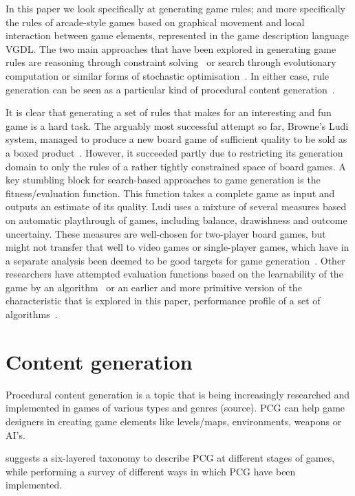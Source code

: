 \documentclass[a4paper,titlepage,final, twoside]{report}
\begin{document}
In this paper we look specifically at generating game rules; and more specifically the rules of arcade-style games based on graphical movement and local interaction between game elements, represented in the game description language VGDL. The two main approaches that have been explored in generating game rules are reasoning through constraint solving~\citet{smith2010variations} or search through evolutionary computation or similar forms of stochastic optimisation~\citet{togelius2008experiment,browne2008automated,font2013towards}. In either case, rule generation can be seen as a particular kind of procedural content generation~\citet{pcgbook:ch6}.

It is clear that generating a set of rules that makes for an interesting and fun game is a hard task. The arguably most successful attempt so far, Browne's Ludi system, managed to produce a new board game of sufficient quality to be sold as a boxed product~\citet{browne2008automated}. However, it succeeded partly due to restricting its generation domain to only the rules of a rather tightly constrained space of board games. A key stumbling block for search-based approaches to game generation is the fitness/evaluation function. This function takes a complete game as input and outputs an estimate of its quality. Ludi uses a mixture of several measures based on automatic playthrough of games, including balance, drawishness and outcome uncertainy. These measures are well-chosen for two-player board games, but might not transfer that well to video games or single-player games, which have in a separate analysis been deemed to be good targets for game generation~\citet{togelius2014characteristics}. Other researchers have attempted evaluation functions based on the learnability of the game by an algorithm~\citet{togelius2008experiment} or an earlier and more primitive version of the characteristic that is explored in this paper, performance profile of a set of algorithms~\citet{font2013towards}.


\section{Content generation}
Procedural content generation is a topic that is being increasingly researched and implemented in games of various types and genres (source). PCG can help game designers in creating game elements like levels/maps, environments, weapons or AI's.

\citet{hendrikx2013procedural} suggests a six-layered taxonomy to describe PCG at different stages of games, while performing a survey of different ways in which PCG have been implemented.
\end{document}
